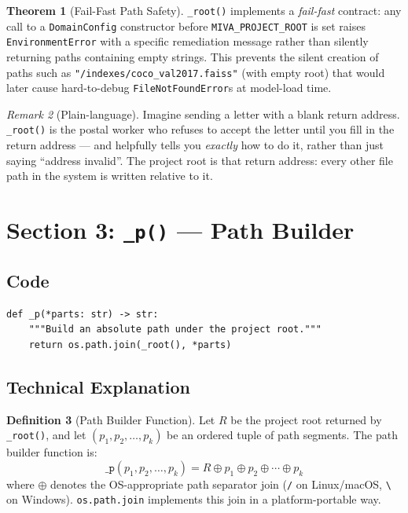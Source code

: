 \documentclass[12pt,a4paper]{article}
\theoremstyle{definition}
\newtheorem{theorem}{Theorem}[section]
\newtheorem{definition}[theorem]{Definition}
\theoremstyle{remark}
\newtheorem{remark}[theorem]{Remark}
\begin{document}
\begin{theorem}[Fail-Fast Path Safety]
\texttt{\_root()} implements a \emph{fail-fast} contract: any call to
a \texttt{DomainConfig} constructor before \texttt{MIVA\_PROJECT\_ROOT} is
set raises \texttt{EnvironmentError} with a specific remediation message
rather than silently returning paths containing empty strings.
This prevents the silent creation of paths such as
\texttt{"/indexes/coco\_val2017.faiss"} (with empty root) that would later
cause hard-to-debug \texttt{FileNotFoundError}s at model-load time.
\end{theorem}

\begin{remark}[Plain-language]
Imagine sending a letter with a blank return address.
\texttt{\_root()} is the postal worker who refuses to accept the letter
until you fill in the return address — and helpfully tells you \emph{exactly}
how to do it, rather than just saying ``address invalid''.
The project root is that return address: every other file path in the
system is written relative to it.
\end{remark}

\section{Section 3: \texttt{\_p()} — Path Builder}

\subsection{Code}

\begin{lstlisting}[caption={\texttt{\_p()} path builder}]
def _p(*parts: str) -> str:
    """Build an absolute path under the project root."""
    return os.path.join(_root(), *parts)
\end{lstlisting}

\subsection{Technical Explanation}

\begin{definition}[Path Builder Function]
Let $R$ be the project root returned by \texttt{\_root()}, and let
$(p_1, p_2, \ldots, p_k)$ be an ordered tuple of path segments.
The path builder function is:
\[
  \texttt{\_p}(p_1, p_2, \ldots, p_k)
  = R \mathbin{\oplus} p_1 \mathbin{\oplus} p_2 \mathbin{\oplus} \cdots \mathbin{\oplus} p_k
\]
where $\oplus$ denotes the OS-appropriate path separator join
(\texttt{/} on Linux/macOS, \texttt{\textbackslash} on Windows).
\texttt{os.path.join} implements this join in a platform-portable way.
\end{definition}
\end{document}
